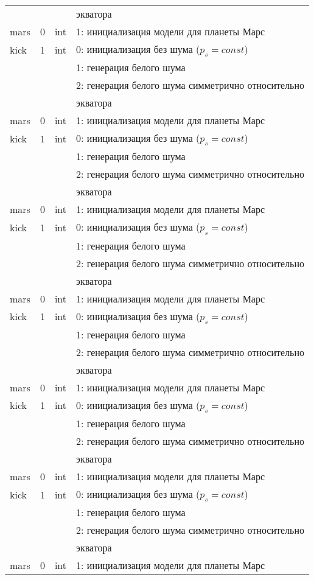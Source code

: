 \begin{longtable}[c]{|l|c|l|l|}
      & & & экватора    \\
     mars & 0 & int & 1: инициализация модели для планеты Марс     \\
    kick & 1 & int & 0: инициализация без шума (\(p_s = const\)) \\
          &   &     & 1: генерация белого шума                  \\
          &   &     & 2: генерация белого шума симметрично относительно \\
      & & & экватора    \\
     mars & 0 & int & 1: инициализация модели для планеты Марс     \\
    kick & 1 & int & 0: инициализация без шума (\(p_s = const\)) \\
          &   &     & 1: генерация белого шума                  \\
          &   &     & 2: генерация белого шума симметрично относительно \\
      & & & экватора    \\
     mars & 0 & int & 1: инициализация модели для планеты Марс     \\
    kick & 1 & int & 0: инициализация без шума (\(p_s = const\)) \\
          &   &     & 1: генерация белого шума                  \\
          &   &     & 2: генерация белого шума симметрично относительно \\
      & & & экватора    \\
     mars & 0 & int & 1: инициализация модели для планеты Марс     \\
    kick & 1 & int & 0: инициализация без шума (\(p_s = const\)) \\
          &   &     & 1: генерация белого шума                  \\
          &   &     & 2: генерация белого шума симметрично относительно \\
      & & & экватора    \\
     mars & 0 & int & 1: инициализация модели для планеты Марс     \\
    kick & 1 & int & 0: инициализация без шума (\(p_s = const\)) \\
          &   &     & 1: генерация белого шума                  \\
          &   &     & 2: генерация белого шума симметрично относительно \\
      & & & экватора    \\
     mars & 0 & int & 1: инициализация модели для планеты Марс     \\
    kick & 1 & int & 0: инициализация без шума (\(p_s = const\)) \\
          &   &     & 1: генерация белого шума                  \\
          &   &     & 2: генерация белого шума симметрично относительно \\
      & & & экватора    \\
     mars & 0 & int & 1: инициализация модели для планеты Марс     \\
    \end{longtable}
\normalsize%
\endgroup
